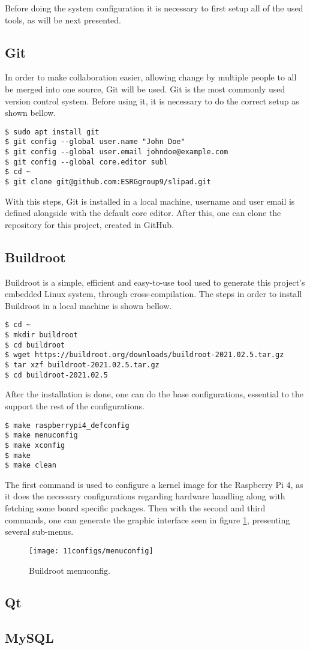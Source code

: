 Before doing the system configuration it is necessary to first setup all of the used tools, as will be next presented.

\subsection{Git}
In order to make collaboration easier, allowing change by multiple people to all be merged into one source, Git will be used. Git is the most commonly used version control system. Before using it, it is necessary to do the correct setup as shown bellow.
\begin{lstlisting}
$ sudo apt install git
$ git config --global user.name "John Doe"
$ git config --global user.email johndoe@example.com
$ git config --global core.editor subl
$ cd ~
$ git clone git@github.com:ESRGgroup9/slipad.git
\end{lstlisting}

With this steps, Git is installed in a local machine, username and user email is defined alongside with the default core editor. After this, one can clone the repository for this project, created in GitHub.

\subsection{Buildroot}
Buildroot is a simple, efficient and easy-to-use tool used to generate this project's embedded Linux system, through cross-compilation. The steps in order to install Buildroot in a local machine is shown bellow.

\begin{lstlisting}
$ cd ~
$ mkdir buildroot
$ cd buildroot
$ wget https://buildroot.org/downloads/buildroot-2021.02.5.tar.gz
$ tar xzf buildroot-2021.02.5.tar.gz
$ cd buildroot-2021.02.5
\end{lstlisting}

After the installation is done, one can do the base configurations, essential to the support the rest of the configurations.
\begin{lstlisting}
$ make raspberrypi4_defconfig
$ make menuconfig
$ make xconfig
$ make 
$ make clean
\end{lstlisting}

The first command is used to configure a kernel image for the Raspberry Pi 4, as it does the necessary configurations regarding hardware handling along with fetching some board specific packages. Then with the second and third commands, one can generate the graphic interface seen in figure \ref{fig:menuconfig}, presenting several sub-menus. 

\begin{figure}[H]
	\centering	
	\texttt{[image: 11configs/menuconfig]}
	\caption{Buildroot menuconfig.}
	\label{fig:menuconfig}
\end{figure}

\subsection{Qt}

\subsection{MySQL}





